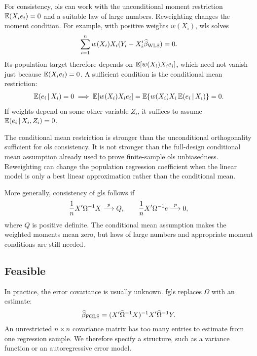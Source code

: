 \documentclass[a4paper,12pt]{article}
\begin{document}
\begin{remark}
	For consistency, \gls{ols} can work with the unconditional moment restriction
	$\operatorname{\mathbb{E}}(X_ie_i)=0$ and a suitable law of large numbers.
	Reweighting changes the moment condition.
	For example, with positive weights $w(X_i)$, \gls{wls} solves
	\begin{align}
		\sum_{i=1}^n w(X_i)X_i(Y_i-X_i^{\prime}\widehat\beta_{\mathrm{WLS}})=0.
	\end{align}
	Its population target therefore depends on $\operatorname{\mathbb{E}}[w(X_i)X_ie_i]$,
	which need not vanish just because $\operatorname{\mathbb{E}}(X_ie_i)=0$.
	A sufficient condition is the conditional mean restriction:
	\begin{align}
		\operatorname{\mathbb{E}}(e_i\mathpunct{}|\mathpunct{} X_i)=0
		\implies
		\operatorname{\mathbb{E}}[w(X_i)X_ie_i]
		=\operatorname{\mathbb{E}}\{w(X_i)X_i\operatorname{\mathbb{E}}(e_i\mathpunct{}|\mathpunct{} X_i)\}=0.
	\end{align}
	If weights depend on some other variable $Z_i$, it suffices to assume $\operatorname{\mathbb{E}}(e_i\mathpunct{}|\mathpunct{} X_i,Z_i)=0$.
\end{remark}

\begin{remark}
    The conditional mean restriction is stronger than the unconditional orthogonality
    sufficient for \gls{ols} consistency.
    It is not stronger than the full-design conditional mean assumption already used
    to prove finite-sample \gls{ols} unbiasedness.
    Reweighting can change the population regression coefficient when the linear model
    is only a best linear approximation rather than the conditional mean.
\end{remark}

\begin{remark}[Consistency]
	More generally, consistency of \gls{gls} follows if
	\begin{align}
		\frac1n X^{\prime}\Omega^{-1} X\overset{p}{\longrightarrow} Q,\qquad
		\frac1n X^{\prime}\Omega^{-1} e\overset{p}{\longrightarrow}0,
	\end{align}
	where $Q$ is positive definite.
	The conditional mean assumption makes the weighted moments mean zero,
	but laws of large numbers and appropriate moment conditions are still needed.
\end{remark}

\subsection{Feasible }

In practice, the error covariance is usually unknown.
\Gls{fgls} replaces $\Omega$ with an estimate:
\begin{align}\label{eq-fgls}
    \widehat\beta_{\mathrm{FGLS}}
    =(X^{\prime}\widehat\Omega^{-1} X)^{-1} X^{\prime}\widehat\Omega^{-1} Y.
\end{align}
An unrestricted $n\times n$ covariance matrix has too many entries to estimate
from one regression sample.
We therefore specify a structure, such as a variance function or an autoregressive error model.
\end{document}
